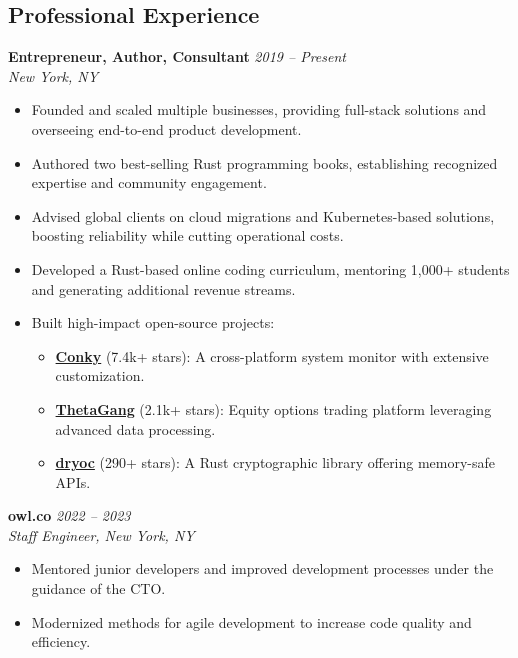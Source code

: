 \documentclass[margin,line]{resume}
\begin{document}
\begin{resume}
\vspace{10pt}

\section{Professional Experience}

\textbf{Entrepreneur, Author, Consultant} \hfill \textit{2019 -- Present}\\
\textit{New York, NY}
\begin{itemize}[leftmargin=0.5cm]
    \item Founded and scaled multiple businesses, providing full-stack solutions and overseeing end-to-end product development.
    \item Authored two best-selling Rust programming books, establishing recognized expertise and community engagement.
    \item Advised global clients on cloud migrations and Kubernetes-based solutions, boosting reliability while cutting operational costs.
    \item Developed a Rust-based online coding curriculum, mentoring 1,000+ students and generating additional revenue streams.
    \item Built high-impact open-source projects:
        \begin{itemize}
            \item \href{https://github.com/brndnmtthws/conky/}{\textbf{Conky}} (7.4k+ stars): A cross-platform system monitor with extensive customization.
            \item \href{https://github.com/brndnmtthws/thetagang/}{\textbf{ThetaGang}} (2.1k+ stars): Equity options trading platform leveraging advanced data processing.
            \item \href{https://github.com/brndnmtthws/dryoc/}{\textbf{dryoc}} (290+ stars): A Rust cryptographic library offering memory-safe APIs.
        \end{itemize}
\end{itemize}

\textbf{owl.co} \hfill \textit{2022 -- 2023}\\
\textit{Staff Engineer, New York, NY}
\begin{itemize}[leftmargin=0.5cm]
    \item Mentored junior developers and improved development processes under the guidance of the CTO.
    \item Modernized methods for agile development to increase code quality and efficiency.
\end{itemize}


\end{resume}
\end{document}
